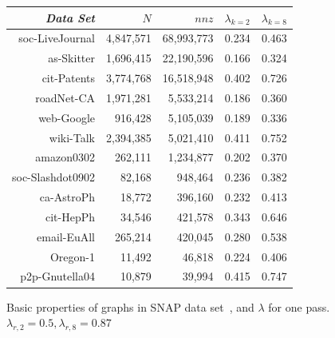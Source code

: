 \begin{figure}
\caption{Basic properties of graphs in SNAP data set~\cite{Leskovec-data}, and $\lambda$ for one pass. $\lambda_{r,2}=0.5,\lambda_{r,8}=0.87$}
\centering
\small
{ \begin{tabular}{ *5r }    \toprule
\label{table:big}
\emph{Data Set} & $N$ & $nnz$  & $\lambda_{k=2}$ & $\lambda_{k=8}$ \\\midrule
soc-LiveJournal & 4,847,571 & 68,993,773  &0.234& 0.463\\
as-Skitter & 1,696,415 & 22,190,596  & 0.166&0.324\\
cit-Patents & 3,774,768 & 16,518,948  & 0.402&0.726\\
roadNet-CA & 1,971,281 & 5,533,214  & 0.186&0.360\\
web-Google & 916,428 & 5,105,039  &0.189&0.336\\
wiki-Talk & 2,394,385 & 5,021,410 &0.411&0.752\\
amazon0302 & 262,111 & 1,234,877 & 0.202&0.370\\
soc-Slashdot0902 & 82,168 & 948,464  &0.236&0.382\\
ca-AstroPh & 18,772 & 396,160 & 0.232&0.413\\
cit-HepPh & 34,546 & 421,578 & 0.343&0.646\\
email-EuAll & 265,214 & 420,045 & 0.280&0.538\\
Oregon-1 & 11,492 & 46,818  & 0.224&0.406\\
p2p-Gnutella04 & 10,879 & 39,994  & 0.415&0.747\\
 \hline
\end{tabular}\par
}
\end{figure}


